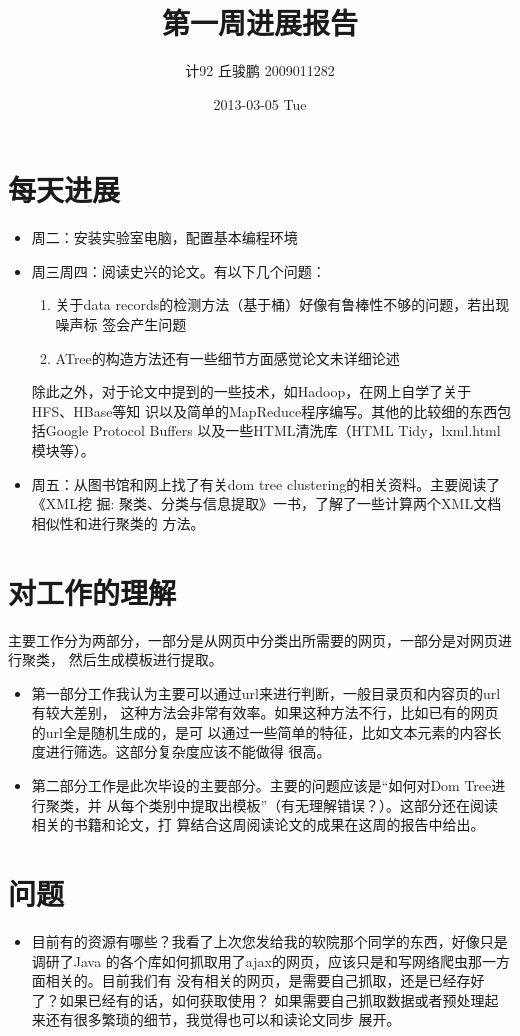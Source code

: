 \documentclass[a4paper]{article}
\title{第一周进展报告}
\author{计92 丘骏鹏 2009011282}
\date{2013-03-05 Tue}
\begin{document}
\maketitle



\section{每天进展}
\label{sec-1}

\begin{itemize}
\item 周二：安装实验室电脑，配置基本编程环境
\item 周三周四：阅读史兴的论文。有以下几个问题：
\begin{enumerate}
\item 关于data records的检测方法（基于桶）好像有鲁棒性不够的问题，若出现噪声标
       签会产生问题
\item ATree的构造方法还有一些细节方面感觉论文未详细论述
\end{enumerate}
除此之外，对于论文中提到的一些技术，如Hadoop，在网上自学了关于HFS、HBase等知
    识以及简单的MapReduce程序编写。其他的比较细的东西包括Google Protocol Buffers
    以及一些HTML清洗库（HTML Tidy，lxml.html模块等）。
\item 周五：从图书馆和网上找了有关dom tree clustering的相关资料。主要阅读了《XML挖
    掘: 聚类、分类与信息提取》一书，了解了一些计算两个XML文档相似性和进行聚类的
    方法。
\end{itemize}
\section{对工作的理解}
\label{sec-2}

主要工作分为两部分，一部分是从网页中分类出所需要的网页，一部分是对网页进行聚类，
然后生成模板进行提取。
\begin{itemize}
\item 第一部分工作我认为主要可以通过url来进行判断，一般目录页和内容页的url有较大差别，
  这种方法会非常有效率。如果这种方法不行，比如已有的网页的url全是随机生成的，是可
  以通过一些简单的特征，比如文本元素的内容长度进行筛选。这部分复杂度应该不能做得
  很高。
\item 第二部分工作是此次毕设的主要部分。主要的问题应该是“如何对Dom Tree进行聚类，并
  从每个类别中提取出模板”（有无理解错误？）。这部分还在阅读相关的书籍和论文，打
  算结合这周阅读论文的成果在这周的报告中给出。
\end{itemize}
\section{问题}
\label{sec-3}

\begin{itemize}
\item 目前有的资源有哪些？我看了上次您发给我的软院那个同学的东西，好像只是调研了Java
  的各个库如何抓取用了ajax的网页，应该只是和写网络爬虫那一方面相关的。目前我们有
  没有相关的网页，是需要自己抓取，还是已经存好了？如果已经有的话，如何获取使用？
  如果需要自己抓取数据或者预处理起来还有很多繁琐的细节，我觉得也可以和读论文同步
  展开。
\end{itemize}
\end{document}
